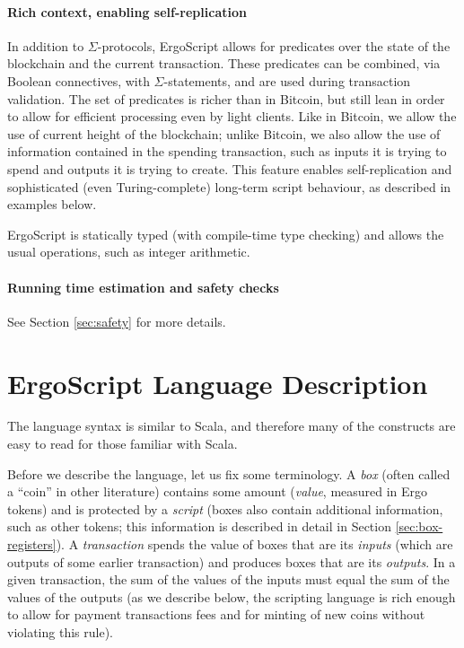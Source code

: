 \documentclass[11pt]{article}
\newcommand{\authnote}[2]{\marginpar{\parbox{\marginparwidth}{\tiny %
  \textsf{#1 {\textcolor{blue}{notes: #2}}}}}%
  \textcolor{blue}{\textbf{\dag}}}
\newcommand{\authnote}[2]{
  \textsf{#1 \textcolor{blue}{: #2}}}
\newcommand{\authnote}[2]{}
\newcommand{\lnote}[1]{{\authnote{\textcolor{orange}{Leo notes}}{#1}}}
\newcommand{\langname}{ErgoScript\xspace}
\begin{document}
\paragraph{Rich context, enabling self-replication}
In addition to $\Sigma$-protocols, \langname allows for predicates over the state of the blockchain and the current transaction. These predicates can be combined, via Boolean connectives, with $\Sigma$-statements, and are used during transaction validation. The set of predicates is richer than in Bitcoin, but still lean in order to allow for efficient processing even by light clients. Like in Bitcoin, we allow the use of current height of the blockchain; unlike Bitcoin, we also allow the use of information contained in the spending transaction, such as inputs it is trying to spend and outputs it is trying to create. This feature enables self-replication and sophisticated (even Turing-complete) long-term script behaviour, as described in examples below.

\langname is statically typed (with compile-time type checking) and allows the usual operations, such as integer arithmetic.

\paragraph{Running time estimation and safety checks}
\lnote{someone should fill this in, because I know very little about it}
See Section \ref{sec:safety} for more details.





\section{\langname Language Description}

\lnote{Should we add, for every code example, a link to the code where it appears? That would help the reader.}

The language syntax is similar to Scala, and therefore many of the constructs are easy to read for those familiar with Scala. 

Before we describe the language, let us fix some terminology. A \emph{box} (often called a ``coin'' in other literature) contains some amount (\emph{value}, measured in Ergo tokens) and is protected by a \emph{script} (boxes also contain additional information, such as other tokens; this information is described in detail in Section \ref{sec:box-registers}). A \emph{transaction} spends the value of boxes that are its \emph{inputs} (which are outputs of some earlier transaction) and produces boxes that are its \emph{outputs}. In a given transaction, the sum of the values of the inputs must equal the sum of the values of the outputs (as we describe below, the scripting language is rich enough to allow for payment transactions fees and for minting of new coins without violating this rule).
\end{document}
